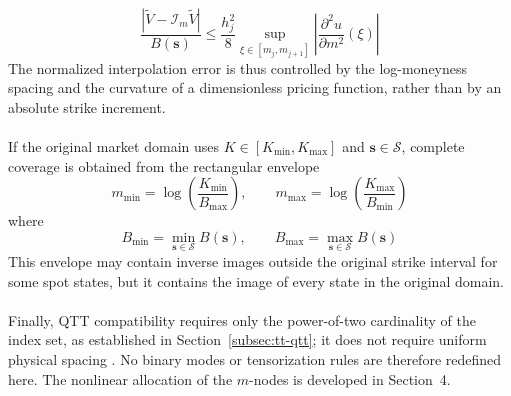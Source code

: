 \documentclass{article}
\numberwithin{equation}{subsection}
\theoremstyle{definition}
\theoremstyle{remark}
\begin{document}
\[
\frac{
\left|
\widetilde{V}
-
\mathcal{I}_m\widetilde{V}
\right|
}{
B(\boldsymbol{s})
}
\leq
\frac{h_j^2}{8}
\sup_{\xi\in[m_j,m_{j+1}]}
\left|
\frac{\partial^2u}{\partial m^2}(\xi)
\right|
\]
The normalized interpolation error is thus controlled by the log-moneyness spacing and the curvature of a dimensionless pricing function, rather than by an absolute strike increment.\\
\\
If the original market domain uses
\(K\in[K_{\min},K_{\max}]\) and
\(\boldsymbol{s}\in\mathcal{S}\), complete coverage is obtained from the
rectangular envelope
\begin{equation}
m_{\min}
=
\log\left(
\frac{K_{\min}}{B_{\max}}
\right),
\qquad
m_{\max}
=
\log\left(
\frac{K_{\max}}{B_{\min}}
\right)
\label{eq:moneyness-domain}
\end{equation}
where
\[
B_{\min}
=
\min_{\boldsymbol{s}\in\mathcal{S}}B(\boldsymbol{s}),
\qquad
B_{\max}
=
\max_{\boldsymbol{s}\in\mathcal{S}}B(\boldsymbol{s})
\]
This envelope may contain inverse images outside the original strike interval
for some spot states, but it contains the image of every state in the original
domain.\\
\\
Finally, QTT compatibility requires only the power-of-two cardinality of the
index set, as established in Section~\ref{subsec:tt-qtt}; it does not require
uniform physical spacing \cite{khoromskij2011qtt,oseledets2011waveletQTT}. No
binary modes or tensorization rules are therefore redefined here. The nonlinear
allocation of the \(m\)-nodes is developed in Section~4.
\end{document}
